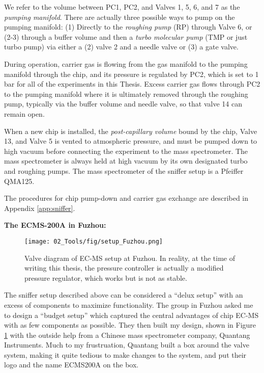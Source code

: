 We refer to the volume between PC1, PC2, and Valves 1, 5, 6, and 7 as the \textit{pumping manifold}. There are actually three possible ways to pump on the pumping manifold: (1) Directly to the \textit{roughing pump} (RP) through Valve 6, or (2-3) through a buffer volume and then a \textit{turbo molecular pump} (TMP or just turbo pump) via either a (2) valve 2 and a needle valve or (3) a gate valve. 

During operation, carrier gas is flowing from the gas manifold to the pumping manifold through the chip, and its pressure is regulated by PC2, which is set to 1 bar for all of the experiments in this Thesis. Excess carrier gas flows through PC2 to the pumping manifold where it is ultimately removed through the roughing pump, typically via the buffer volume and needle valve, so that valve 14 can remain open.

When a new chip is installed, the \textit{post-capillary volume} bound by the chip, Valve 13, and Valve 5 is vented to atmospheric pressure, and must be pumped down to high vacuum before connecting the experiment to the mass spectrometer. The mass spectrometer is always held at high vacuum by its own designated turbo and roughing pumps. The mass spectrometer of the sniffer setup is a Pfeiffer QMA125.

The procedures for chip pump-down and carrier gas exchange are described in Appendix \ref{app:sniffer}.

\vspace{1cm}
\textbf{\large The ECMS-200A in Fuzhou:}

\begin{figure}[h!]
	\centering
	\texttt{[image: 02\_Tools/fig/setup\_Fuzhou.png]}
	\caption{Valve diagram of EC-MS setup at Fuzhou. In reality, at the time of writing this thesis, the pressure controller is actually a modified pressure regulator, which works but is not as stable.}
	\label{fig:Fuzhou}
\end{figure}

The sniffer setup described above can be considered a ``delux setup'' with an excess of components to maximize functionality. The group in Fuzhou asked me to design a ``budget setup'' which captured the central advantages of chip EC-MS with as few components as possible. They then built my design, shown in Figure \ref{fig:Fuzhou} with the outside help from a Chinese mass spectrometer company, Quantang Instruments. Much to my frustruation, Quantang built a box around the valve system, making it quite tedious to make changes to the system, and put their logo and the name ECMS200A on the box.

